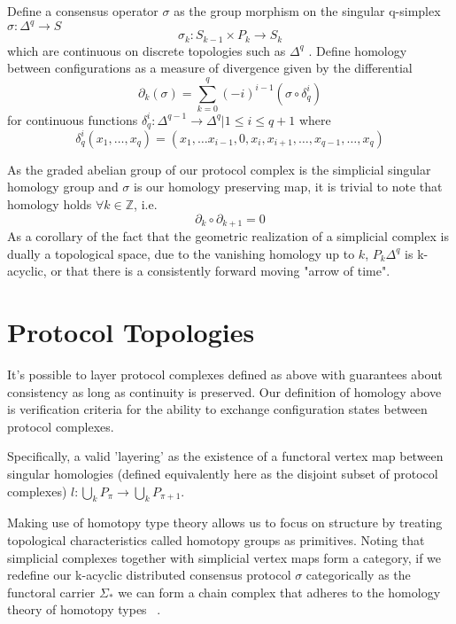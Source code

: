 \documentclass[runningheads]{llncs}
\begin{document}
Define a consensus operator $\sigma$ as the group morphism on the singular q-simplex $\sigma: \Delta^q \rightarrow S$ 
\begin{equation} \label{eq1}
\sigma_k: S_{k-1} \times P_k \rightarrow S_{k}
\end{equation} \label{eq1}
which are continuous on discrete topologies such as $\Delta^q$ \cite{ref_article1}. Define homology between configurations as a measure of divergence given by the differential 
\begin{equation} 
\partial_k(\sigma) = \sum^{q}_{k=0} (-i)^{i-1}(\sigma \circ \delta_q^{i} )
\end{equation}
for continuous functions $\delta^{i}_q: \Delta^{q-1} \rightarrow \Delta^q | 1 \leq i \leq q+1$ where 
\begin{equation}
\delta^{i}_q(x_1, \dots, x_q) = (x_1, \dots x_{i-1}, 0, x_i, x_{i+1}, \dots, x_{q-1}, \dots, x_q)
\end{equation}

As the graded abelian group of our protocol complex is the simplicial singular homology group and $\sigma$ is our homology preserving map, it is trivial to note that homology holds $\forall k \in \mathbb{Z}$, i.e.
\begin{equation} \label{eq1}
\partial_k \circ \partial_{k+1} = 0
\end{equation} \label{eq1}
As a corollary of the fact that the geometric realization of a simplicial complex is dually a topological space, due to the vanishing homology up to $k$, $P_k\Delta^q$ is k-acyclic, or that there is a consistently forward moving "arrow of time".

\section{Protocol Topologies}
It's possible to layer protocol complexes defined as above with guarantees about consistency as long as continuity is preserved. Our definition of homology above is verification criteria for the ability to exchange configuration states between protocol complexes.

Specifically, a valid 'layering' as the existence of a functoral vertex map between singular homologies (defined equivalently here as the disjoint subset of protocol complexes) $l: \bigcup_{k} P_{\pi} \rightarrow \bigcup_{k} P_{\pi+1}$.

Making use of homotopy type theory allows us to focus on structure by treating topological characteristics called homotopy groups as primitives. Noting that simplicial complexes together with simplicial vertex maps form a category, if we redefine our k-acyclic distributed consensus protocol $\sigma$ categorically as the functoral carrier $\Sigma_{*}$  we can form a chain complex that adheres to the homology theory of homotopy types ~\cite{ref_article5}.
\end{document}

